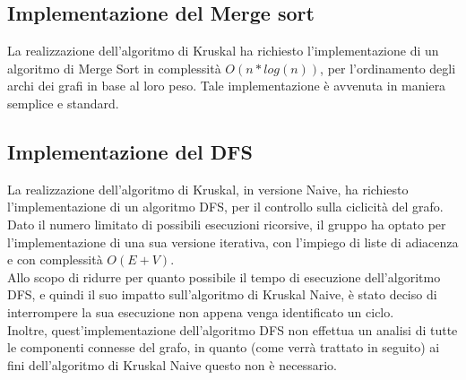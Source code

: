 \subsection{Implementazione del Merge sort}
La realizzazione dell'algoritmo di Kruskal ha richiesto l'implementazione di un algoritmo di Merge Sort in complessità $O(n*log(n))$, per l'ordinamento degli archi dei grafi in base al loro peso. Tale implementazione è avvenuta in maniera semplice e standard.
\subsection{Implementazione del DFS}
La realizzazione dell'algoritmo di Kruskal, in versione Naive, ha richiesto l'implementazione di un algoritmo DFS, per il controllo sulla ciclicità del grafo. Dato il numero limitato di possibili esecuzioni ricorsive, il gruppo ha optato per l'implementazione di una sua versione iterativa, con l'impiego di liste di adiacenza e con complessità $O(E+V)$. \\
Allo scopo di ridurre per quanto possibile il tempo di esecuzione dell'algoritmo DFS, e quindi il suo impatto sull'algoritmo di Kruskal Naive, è stato deciso di interrompere la sua esecuzione non appena venga identificato un ciclo. \\
Inoltre, quest'implementazione dell'algoritmo DFS non effettua un analisi di tutte le componenti connesse del grafo, in quanto (come verrà trattato in seguito) ai fini dell'algoritmo di Kruskal Naive questo non è necessario.

